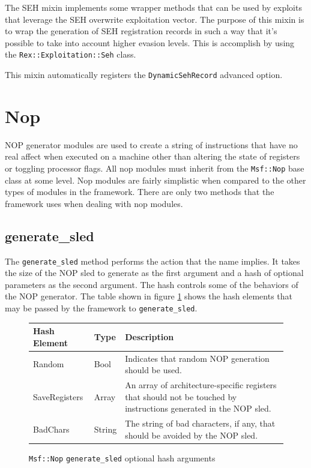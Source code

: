 \documentclass{report}
\begin{document}
\par
The SEH mixin implements some wrapper methods that can be used by
exploits that leverage the SEH overwrite exploitation vector.  The
purpose of this mixin is to wrap the generation of SEH registration
records in such a way that it's possible to take into account higher
evasion levels.  This is accomplish by using the
\texttt{Rex::Exploitation::Seh} class.

\par
This mixin automatically registers the \texttt{DynamicSehRecord}
advanced option.

    \section{Nop}

\par
NOP generator modules are used to create a string of instructions
that have no real affect when executed on a machine other than
altering the state of registers or toggling processor flags.  All
nop modules must inherit from the \texttt{Msf::Nop} base class at
some level.  Nop modules are fairly simplistic when compared to the
other types of modules in the framework.  There are only two methods
that the framework uses when dealing with nop modules.

        \subsection{generate\_sled}

\par
The \texttt{generate\_sled} method performs the action that the name
implies.  It takes the size of the NOP sled to generate as the first
argument and a hash of optional parameters as the second argument.
The hash controls some of the behaviors of the NOP generator.  The
table shown in figure \ref{fig-table-nop-genhash} shows the hash
elements that may be passed by the framework to
\texttt{generate\_sled}.

\begin{figure}[h]
\begin{center}
\begin{tabular}{|l|l|p{3.0in}|}
\hline
\textbf{Hash Element} & \textbf{Type} & \textbf{Description} \\
\hline
Random & Bool & Indicates that random NOP generation should be used. \\
\hline
SaveRegisters & Array & An array of architecture-specific registers that should not be touched by instructions generated in the NOP sled. \\
\hline
BadChars & String & The string of bad characters, if any, that should be avoided by the NOP sled. \\
\hline
\end{tabular}
\caption{\texttt{Msf::Nop} \texttt{generate\_sled} optional hash
arguments} \label{fig-table-nop-genhash}
\end{center}
\end{figure}
\end{document}
